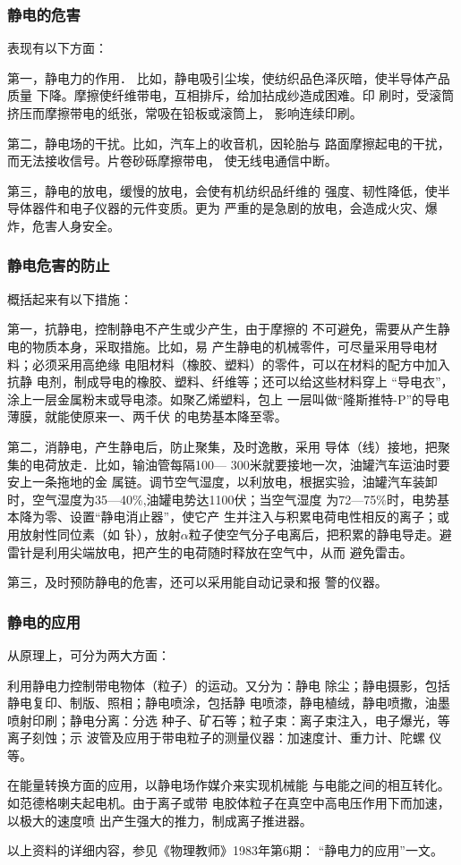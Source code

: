 \subsubsection{静电的危害}

表现有以下方面：

第一，静电力的作用．
比如，静电吸引尘埃，使纺织品色泽灰暗，使半导体产品质量
下降。摩擦使纤维带电，互相排斥，给加拈成纱造成困难。印
刷时，受滚筒挤压而摩擦带电的纸张，常吸在铅板或滚筒上，
影响连续印刷。

第二，静电场的干扰。比如，汽车上的收音机，因轮胎与
路面摩擦起电的干扰，而无法接收信号。片卷砂砾摩擦带电，
使无线电通信中断。

第三，静电的放电，缓慢的放电，会使有机纺织品纤维的
强度、韧性降低，使半导体器件和电子仪器的元件变质。更为
严重的是急剧的放电，会造成火灾、爆炸，危害人身安全。


\subsubsection{静电危害的防止}

概括起来有以下措施：

第一，抗静电，控制静电不产生或少产生，由于摩擦的
不可避免，需要从产生静电的物质本身，采取措施。比如，易
产生静电的机械零件，可尽量采用导电材料；必须采用高绝缘
电阻材料（橡胶、塑料）的零件，可以在材料的配方中加入抗静
电剂，制成导电的橡胶、塑料、纤维等；还可以给这些材料穿上
“导电衣”，涂上一层金属粉末或导电漆。如聚乙烯塑料，包上
一层叫做“隆斯推特-P”的导电薄膜，就能使原来一、两千伏
的电势基本降至零。

第二，消静电，产生静电后，防止聚集，及时逸散，采用
导体（线）接地，把聚集的电荷放走．比如，输油管每隔100—
300米就要接地一次，油罐汽车运油时要安上一条拖地的金
属链。调节空气湿度，以利放电，根据实验，油罐汽车装卸
时，空气湿度为35—40\%,油罐电势达1100伏；当空气湿度
为72—75\%时，电势基本降为零、设置“静电消止器”，使它产
生并注入与积累电荷电性相反的离子；或用放射性同位素（如
钋），放射$\alpha$粒子使空气分子电离后，把积累的静电导走。避
雷针是利用尖端放电，把产生的电荷随时释放在空气中，从而
避免雷击。

第三，及时预防静电的危害，还可以采用能自动记录和报
警的仪器。

\subsubsection{静电的应用}

从原理上，可分为两大方面：

利用静电力控制带电物体（粒子）的运动。又分为：静电
除尘；静电摄影，包括静电复印、制版、照相；静电喷涂，包括静
电喷漆，静电植绒，静电喷撒，油墨喷射印刷；静电分离：分选
种子、矿石等；粒子束：离子束注入，电子爆光，等离子刻蚀；示
波管及应用于带电粒子的测量仪器：加速度计、重力计、陀螺
仪等。

在能量转换方面的应用，以静电场作媒介来实现机械能
与电能之间的相互转化。如范德格喇夫起电机。由于离子或带
电胶体粒子在真空中高电压作用下而加速，以极大的速度喷
出产生强大的推力，制成离子推进器。

以上资料的详细内容，参见《物理教师》1983年第6期：
“静电力的应用”一文。




